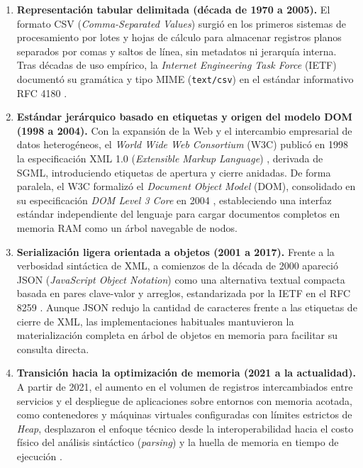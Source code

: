 \begin{enumerate}
    \item \textbf{Representación tabular delimitada (década de 1970 a 2005).} El formato CSV (\textit{Comma-Separated Values}) surgió en los primeros sistemas de procesamiento por lotes y hojas de cálculo para almacenar registros planos separados por comas y saltos de línea, sin metadatos ni jerarquía interna. Tras décadas de uso empírico, la \textit{Internet Engineering Task Force} (IETF) documentó su gramática y tipo MIME (\texttt{text/csv}) en el estándar informativo RFC 4180 \cite{shafranovich2005}.
    \item \textbf{Estándar jerárquico basado en etiquetas y origen del modelo DOM (1998 a 2004).} Con la expansión de la Web y el intercambio empresarial de datos heterogéneos, el \textit{World Wide Web Consortium} (W3C) publicó en 1998 la especificación XML 1.0 (\textit{Extensible Markup Language}) \cite{bray1998}, derivada de SGML, introduciendo etiquetas de apertura y cierre anidadas. De forma paralela, el W3C formalizó el \textit{Document Object Model} (DOM), consolidado en su especificación \textit{DOM Level 3 Core} en 2004 \cite{w3cdom2004}, estableciendo una interfaz estándar independiente del lenguaje para cargar documentos completos en memoria RAM como un árbol navegable de nodos.
    \item \textbf{Serialización ligera orientada a objetos (2001 a 2017).} Frente a la verbosidad sintáctica de XML, a comienzos de la década de 2000 apareció JSON (\textit{JavaScript Object Notation}) como una alternativa textual compacta basada en pares clave-valor y arreglos, estandarizada por la IETF en el RFC 8259 \cite{bray2017}. Aunque JSON redujo la cantidad de caracteres frente a las etiquetas de cierre de XML, las implementaciones habituales mantuvieron la materialización completa en árbol de objetos en memoria para facilitar su consulta directa.
    \item \textbf{Transición hacia la optimización de memoria (2021 a la actualidad).} A partir de 2021, el aumento en el volumen de registros intercambiados entre servicios y el despliegue de aplicaciones sobre entornos con memoria acotada, como contenedores y máquinas virtuales configuradas con límites estrictos de \textit{Heap}, desplazaron el enfoque técnico desde la interoperabilidad hacia el costo físico del análisis sintáctico (\textit{parsing}) y la huella de memoria en tiempo de ejecución \cite{ieee_les_2024, maltsev2024}.
\end{enumerate}

